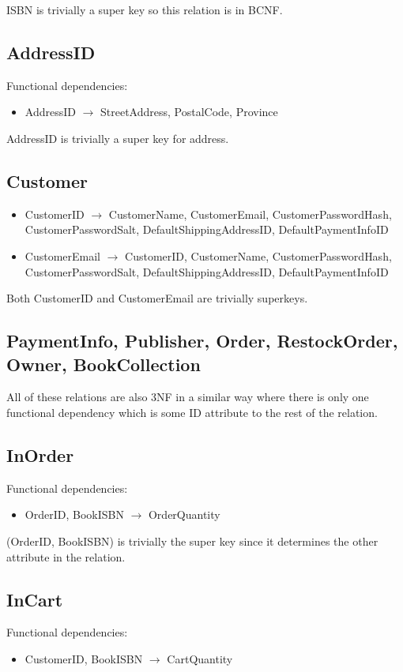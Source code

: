 \documentclass{article}
\newcommand{\trightarrow}{\(\rightarrow\)}
\begin{document}
ISBN is trivially a super key so this relation is in BCNF.

\subsection{AddressID}
Functional dependencies:
\begin{itemize}
  \item AddressID \trightarrow{} StreetAddress, PostalCode, Province
\end{itemize}

AddressID is trivially a super key for address.

\subsection{Customer}
\begin{itemize}
  \item CustomerID \trightarrow{} CustomerName, CustomerEmail, CustomerPasswordHash, CustomerPasswordSalt, DefaultShippingAddressID, DefaultPaymentInfoID
  \item CustomerEmail \trightarrow{} CustomerID, CustomerName, CustomerPasswordHash, CustomerPasswordSalt, DefaultShippingAddressID, DefaultPaymentInfoID
\end{itemize}

Both CustomerID and CustomerEmail are trivially superkeys.

\subsection{PaymentInfo, Publisher, Order, RestockOrder, Owner, BookCollection}
All of these relations are also 3NF in a similar way where there is only one functional dependency which is some ID attribute to the rest of the relation.

\subsection{InOrder}
Functional dependencies:
\begin{itemize}
  \item OrderID, BookISBN \trightarrow{} OrderQuantity
\end{itemize}

(OrderID, BookISBN) is trivially the super key since it determines the other attribute in the relation.

\subsection{InCart}
Functional dependencies:
\begin{itemize}
  \item CustomerID, BookISBN \trightarrow{} CartQuantity
\end{itemize}
\end{document}
